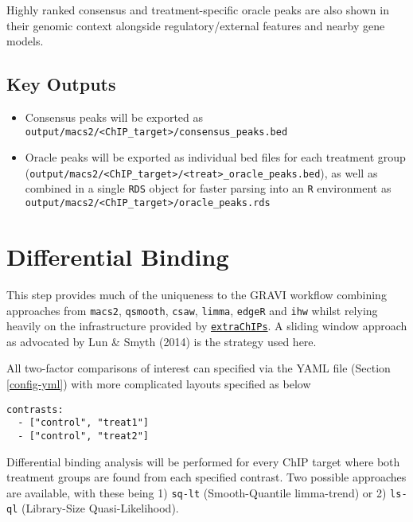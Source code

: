 \documentclass[
]{book}
\providecommand{\tightlist}{%
  \setlength{\itemsep}{0pt}\setlength{\parskip}{0pt}}
\begin{document}
Highly ranked consensus and treatment-specific oracle peaks are also shown in their genomic context alongside regulatory/external features and nearby gene models.

\hypertarget{key-outputs}{%
\subsection*{Key Outputs}\label{key-outputs}}

\begin{itemize}
\tightlist
\item
  Consensus peaks will be exported as \texttt{output/macs2/\textless{}ChIP\_target\textgreater{}/consensus\_peaks.bed}
\item
  Oracle peaks will be exported as individual bed files for each treatment group (\texttt{output/macs2/\textless{}ChIP\_target\textgreater{}/\textless{}treat\textgreater{}\_oracle\_peaks.bed}), as well as combined in a single \texttt{RDS} object for faster parsing into an \texttt{R} environment as \texttt{output/macs2/\textless{}ChIP\_target\textgreater{}/oracle\_peaks.rds}
\end{itemize}

\hypertarget{differential-binding}{%
\section{Differential Binding}\label{differential-binding}}

This step provides much of the uniqueness to the GRAVI workflow combining approaches from \texttt{macs2}\citep{macs2}, \texttt{qsmooth}\citep{qsmooth}, \texttt{csaw}\citep{csaw}, \texttt{limma}\citep{limma}, \texttt{edgeR}\citep{edger} and \texttt{ihw}\citep{ihw} whilst relying heavily on the infrastructure provided by \href{https://bioconductor.org/packages/release/bioc/html/extraChIPs.html}{\texttt{extraChIPs}}.
A sliding window approach as advocated by Lun \& Smyth (2014) is the strategy used here.

All two-factor comparisons of interest can specified via the YAML file (Section \ref{config-yml}) with more complicated layouts specified as below

\begin{verbatim}
contrasts:
  - ["control", "treat1"]
  - ["control", "treat2"]
\end{verbatim}

Differential binding analysis will be performed for every ChIP target where both treatment groups are found from each specified contrast.
Two possible approaches are available, with these being 1) \texttt{sq-lt} (Smooth-Quantile limma-trend) or 2) \texttt{ls-ql} (Library-Size Quasi-Likelihood).
\end{document}
